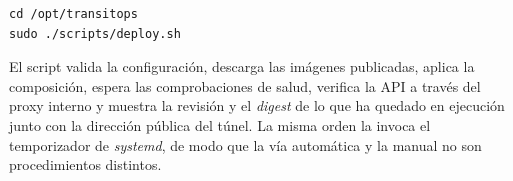 \begin{verbatim}
cd /opt/transitops
sudo ./scripts/deploy.sh
\end{verbatim}

El script valida la configuración, descarga las imágenes publicadas, aplica la composición, espera las comprobaciones de salud, verifica la API a través del proxy interno y muestra la revisión y el \emph{digest} de lo que ha quedado en ejecución junto con la dirección pública del túnel. La misma orden la invoca el temporizador de \emph{systemd}, de modo que la vía automática y la manual no son procedimientos distintos.
